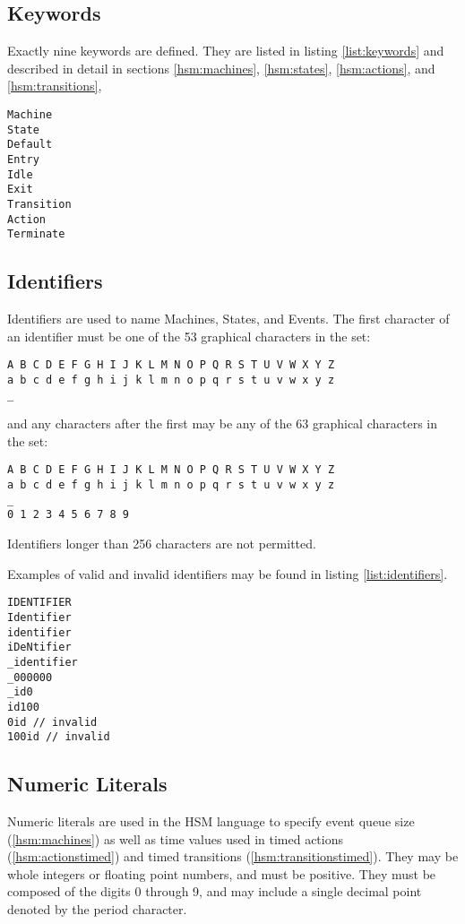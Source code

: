 \documentclass[titlepage,letterpaper]{report}
\begin{document}
\subsection{Keywords}

\label{hsm:keywords}

Exactly nine keywords are defined.  They are listed in listing \ref{list:keywords} and
described in detail in sections
\ref{hsm:machines}, 
\ref{hsm:states}, 
\ref{hsm:actions}, 
and
\ref{hsm:transitions}, 

\begin{lstlisting}[caption={Keywords},label={list:keywords},float,frame=lines]
Machine
State
Default
Entry
Idle
Exit
Transition
Action
Terminate
\end{lstlisting}

\subsection{Identifiers}

Identifiers are used to name Machines, States, and Events.  The first character of
an identifier must be one of the 53 graphical characters in the set:
\begin{verbatim}
A B C D E F G H I J K L M N O P Q R S T U V W X Y Z
a b c d e f g h i j k l m n o p q r s t u v w x y z
_
\end{verbatim}
and any characters after the first may be any of the 63 graphical characters in the set:
\begin{verbatim}
A B C D E F G H I J K L M N O P Q R S T U V W X Y Z
a b c d e f g h i j k l m n o p q r s t u v w x y z
_
0 1 2 3 4 5 6 7 8 9
\end{verbatim}
Identifiers longer than 256 characters are not permitted.

Examples of valid and invalid identifiers may be found in listing \ref{list:identifiers}.

\begin{lstlisting}[caption={Identifier Examples},label={list:identifiers},float,frame=lines]
IDENTIFIER
Identifier
identifier
iDeNtifier
_identifier
_000000
_id0
id100
0id // invalid
100id // invalid
\end{lstlisting}


\subsection{Numeric Literals}

Numeric literals are used in the HSM language to specify event queue size (\ref{hsm:machines}) as well as 
time values used in timed actions (\ref{hsm:actionstimed})
and timed transitions (\ref{hsm:transitionstimed}).  
They may be whole integers or floating point numbers, and must be positive.  They must be composed of the digits
0 through 9, and may include a single decimal point denoted by the period character.
\end{document}
